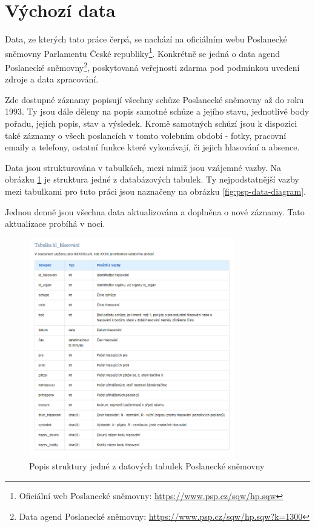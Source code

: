 \section{Výchozí data}
Data, ze kterých tato práce čerpá, se nachází na oficiálním webu Poslanecké sněmovny Parlamentu České republiky\footnote{Oficiální web Poslanecké sněmovny: \url{https://www.psp.cz/sqw/hp.sqw}}. Konkrétně se jedná o data agend Poslanecké sněmovny\footnote{Data agend Poslanecké sněmovny: \url{https://www.psp.cz/sqw/hp.sqw?k=1300}}, poskytovaná veřejnosti zdarma pod podmínkou uvedení zdroje a data zpracování\cite{pspData}.
\par Zde dostupné záznamy popisují všechny schůze Poslanecké sněmovny až do roku 1993. Ty jsou dále děleny na popis samotné schůze a jejího stavu, jednotlivé body pořadu, jejich popis, stav a výsledek. Kromě samotných schůzí jsou k dispozici také záznamy o všech poslancích v tomto volebním období - fotky, pracovní emaily a telefony, ostatní funkce které vykonávají, či jejich hlasování a absence.
\par Data jsou strukturována v tabulkách, mezi nimiž jsou vzájemné vazby. Na obrázku \ref{fig:psp-tabulka-priklad} je struktura jedné z databázových tabulek. Ty nejpodstatnější vazby mezi tabulkami pro tuto práci jsou naznačeny na obrázku \ref{fig:psp-data-diagram}.
\par Jednou denně jsou všechna data aktualizována a doplněna o nové záznamy. Tato aktualizace probíhá v noci.



\begin{figure}
    \centering
    \includegraphics[width=0.8\textwidth]{obrazky-figures/psp-tabulka-priklad.png}
    \caption{Popis struktury jedné z datových tabulek Poslanecké sněmovny\cite{pspData}}
    \label{fig:psp-tabulka-priklad}
\end{figure}

